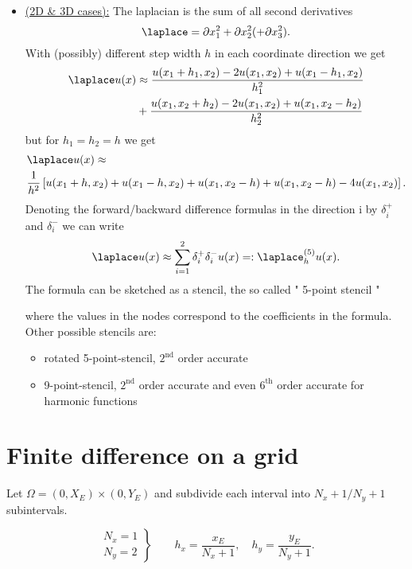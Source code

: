 \begin{itemize}
	\item \underline{(2D \& 3D cases):} 
		The laplacian is the sum of all second derivatives
		\[
			\laplace = \partial x_1^2 + \partial x_2^2 (+\partial x_3^2)
		.\] 
		With (possibly) different step width $h$ in each coordinate direction we get
		\begin{align*}
			\laplace u(x) &\approx \frac{u(x_1 + h_1, x_2) - 2u(x_1, x_2) + u(x_1 -h_1, x_2)}{h_1^2}\\
						  &+ \frac{u(x_1, x_2 + h_2) - 2u(x_1, x_2) + u(x_1, x_2 -h_2)}{h_2^2}
		\end{align*}
		but for $h_1 = h_2 = h$ we get
		\begin{align*}
			&\laplace u(x) \approx\\ 
			&\frac{1}{h^2}\left[u(x_1+ h, x_2) + u(x_1-h, x_2) + u(x_1, x_2 -h) + u(x_1, x_2 -h) -4u(x_1, x_2)\right].
		\end{align*}
		Denoting the forward/backward difference formulas
		in the direction i by $\delta_{i}^{+}$ and $\delta_{i}^{-}$ we can write
		\[
			\laplace u(x) \approx \sum_{i=1}^{2}{\delta_{i}^{+}\delta_{i}^{-}u(x)}=:\laplace_{h}^{(5)}u(x)
		.\] 
		The formula can be sketched as a stencil, the so called " 5-point stencil "
		
		where the values in the nodes correspond to the coefficients in the formula.
		Other possible stencils are:
		\begin{itemize}
			\item rotated 5-point-stencil, $2^{\text{nd}}$ order accurate
				
			\item 9-point-stencil,  $2^{\text{nd}}$ order accurate and even $6^{\text{th}}$ order accurate for harmonic functions
				
		\end{itemize}
\end{itemize}

\section{Finite difference on a grid}%
\label{sec:Finite difference on a grid}
Let $\Omega =(0, X_{E}) \times (0,Y_{E})$ and subdivide each interval into $N_{x}+1 / N_{y} + 1$ subintervals.

\[
\left.
	\begin{array}{c}
	N_{x} = 1 \\
	N_{y} = 2
\end{array}
\right\} \qquad
h_{x} = \frac{x_{E}}{N_{x}+1}, \quad h_{y}= \frac{y_{E}}{N_{y}+1}
.\] 

